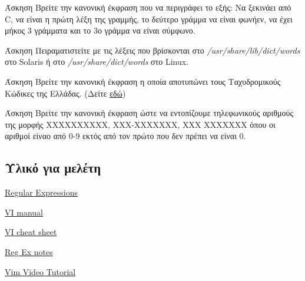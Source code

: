 \begin{exercisebox}{  Άσκηση}
Βρείτε την κανονική έκφραση που να περιγράφει το εξής: Να ξεκινάει από C, να είναι η πρώτη λέξη της γραμμής, το δεύτερο γράμμα να είναι φωνήεν, να έχει μήκος 3 γράμματα και το 3ο γράμμα να είναι σύμφωνο.
\end{exercisebox}




\begin{exercisebox}{ Άσκηση}
Πειραματιστείτε με τις λέξεις που βρίσκονται στο \emph{/usr/share/lib/dict/words} στο Solaris ή στο \emph{/usr/share/dict/words} στο Linux.
\end{exercisebox}



\begin{exercisebox}{ Άσκηση}
Βρείτε την κανονική έκφραση η οποία αποτυπώνει τους Ταχυδρομικούς Κώδικες της Ελλάδας. (Δείτε \href{http://goo.gl/TRZqdu}{εδώ})
\end{exercisebox}


\begin{exercisebox}{ Άσκηση}
Βρείτε την κανονική έκφραση ώστε να εντοπίζουμε τηλεφωνικούς αριθμούς της μορφής ΧΧΧΧΧΧΧΧΧΧ, ΧΧΧ-ΧΧΧΧΧΧΧ, ΧΧΧ ΧΧΧΧΧΧΧ όπου οι αριθμοί είναο από 0-9 εκτός από τον πρώτο που δεν πρέπει να είναι 0.
\end{exercisebox}

\subsection{Υλικό για μελέτη}
\begin{packed_item}
	\item \href{http://www.grymoire.com/Unix/Regular.html}{Regular Expressions}
	\item \href{http://www.netads.com/~meo/useful/vi/vi.rm.html}{VI manual}
	\item \href{http://ryanstutorials.net/linuxtutorial/cheatsheetvi.php}{VI cheat sheet}
	\item \href{https://cs.lmu.edu/~ray/notes/regex/}{Reg Ex notes}
	\item \href{https://www.youtube.com/watch?v=yVTc_EuL3vo&list=PLXVWHDFdFYFgKPEMLVOsYy77WQ2unHeo2&index=2&t=4421s}{Vim Video Tutorial}
\end{packed_item}



